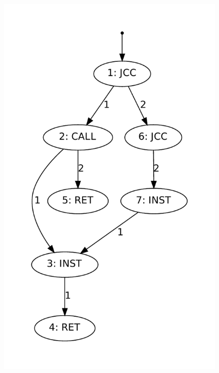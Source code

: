 \begin{figure}[h]
\begin{center}
{\label{fig:troisProf2}
\includegraphics[height=0.4\textheight]{supports/algos/images/g2prof.pdf}}
\subfigure[]{
\label{fig:troisProf3}
}
\end{center}
\end{figure}

